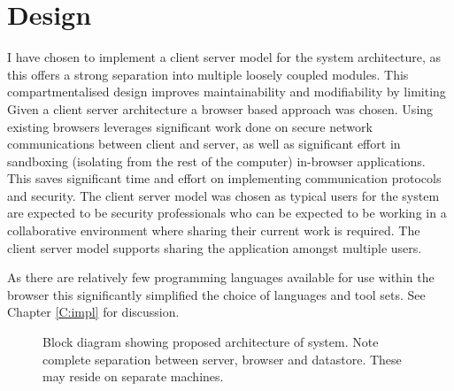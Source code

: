 \chapter{Design}\label{design}

I have chosen to implement a client server model for the system architecture, as this offers a strong separation into multiple loosely coupled modules. This compartmentalised design improves maintainability and modifiability by limiting  Given a client server architecture a browser based approach was chosen. Using existing browsers leverages significant work done on secure network communications between client and server, as well as significant effort in sandboxing (isolating from the rest of the computer) in-browser applications. This saves significant time and effort on implementing communication protocols and security.  The client server model was chosen as typical users for the system are expected to be security professionals who can be expected to be working in a collaborative environment where sharing their current work is required. The client server model supports sharing the application amongst multiple users. 

As there are relatively few programming languages available for use within the browser this significantly simplified the choice of languages and tool sets. See Chapter \ref{C:impl} for discussion.

\begin{figure}[tbh]
\caption{\protect\label{spiral_plan}Block diagram showing proposed architecture of system. Note complete separation between server, browser and datastore. These may reside on separate machines.}
\end{figure}

